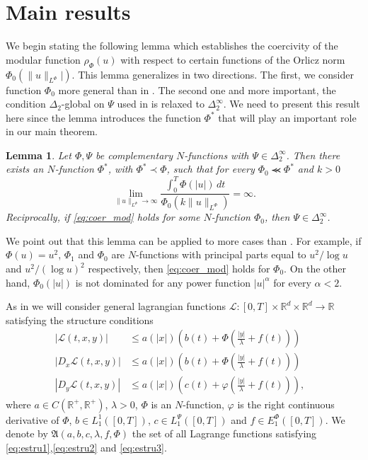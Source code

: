 \documentclass[twoside]{article}
\newtheorem{lem}[thm]{Lemma}
\theoremstyle{remark}
\newcommand{\orlnor}{\|_{L^{\Phi}}}
\newcommand{\lpsi}{L^{\Psi}}
\newcommand{\ephi}{E^{\Phi}}
\newcommand{\rr}{\mathbb{R}}
\renewcommand{\leq}{\leqslant}
\newcounter{example}
\begin{document}
\section{Main results}

We begin stating the following lemma which establishes the coercivity of the modular function $\rho_{\Phi}(u)$ with respect to certain functions of the Orlicz norm $\Phi_0(\|u\orlnor|)$. This lemma generalizes \cite[Lemma 5.2]{ABGMS2015} in two directions. The first, we consider function $\Phi_0$ more general than in  \cite[Lemma 5.2]{ABGMS2015}. The second one and more important, the condition $\Delta_2$-global on $\Psi$ used in \cite[Lemma 5.2]{ABGMS2015} is relaxed to $\Delta_2^{\infty}$. We need to present this result here since the lemma introduces the function $\Phi^*$ that will play an important role in our main theorem.

\begin{lem}\label{lem_coer}
Let $\Phi,\Psi$ be complementary $N$-functions with $\Psi \in \Delta_2^{\infty}$. 
Then there exists an $N$-function $\Phi^*$, with $\Phi^*\prec\Phi$, such that  for every $\Phi_0\llcurly\Phi^*$ and $k>0$
\begin{equation}\label{eq:coer_mod}
\lim\limits_{\|u\orlnor\to \infty}
\frac{\int_0^T \Phi(|u|)\,dt}{\Phi_0(k\|u\orlnor)}=\infty.
\end{equation}
Reciprocally, if  \eqref{eq:coer_mod} holds for some $N$-function $\Phi_0$,  then $\Psi\in\Delta_2^{\infty}$.
\end{lem}



 We point out that this lemma can be applied to more cases than \cite[Lemma 5.2]{ABGMS2015}. For example, if $\Phi(u)=u^2$, $\Phi_1$ and $\Phi_0$ are  $N$-functions with principal parts equal to $u^2/\log u$ and $u^2/(\log u)^2$ respectively, then  \eqref{eq:coer_mod} holds for $\Phi_0$. On the other hand, $\Phi_0(|u|)$ is not dominated for any  power function $|u|^{\alpha}$ for every $\alpha<2$.




As in  \cite{ABGMS2015} we will consider general lagrangian functions
$\mathcal{L}:[0,T]\times\rr^d\times\rr^d\to\rr$
satisfying the structure conditions
\begin{align}
|\mathcal{L}(t,x,y)| &\leq a(|x|)\left(b(t)+ \Phi\left(\frac{|y|}{\lambda}+f(t) \right)\right)&\tag{$A_1$}\label{eq:estru1}
\\
|D_{x}\mathcal{L}(t,x,y)| &\leq a(|x|)\left(b(t)+ \Phi\left(\frac{|y|}{\lambda}+f(t) \right)\right)&\tag{$A_2$}\label{eq:estru2}
\\
|D_{y}\mathcal{L}(t,x,y)| &\leq a(|x|)\left(c(t)+ \varphi\left(\frac{|y|}{\lambda}+f(t)\right)\right),
&\tag{$A_3$}\label{eq:estru3}
\end{align}
where $a\in C(\mathbb{R}^+,\mathbb{R}^+)$, $\lambda>0$, $\Phi$ is an $N$-function,
$\varphi$ is the right continuous derivative of $\Phi$,
$b\in L^1_1([0,T])$,  $c\in\lpsi_1([0,T])$ and  $f\in \ephi_1([0,T])$. We denote by $\mathfrak{A}(a,b,c,\lambda,f,\Phi)$ the set of all Lagrange functions satisfying  \eqref{eq:estru1},\eqref{eq:estru2} and \eqref{eq:estru3}.
\end{document}
